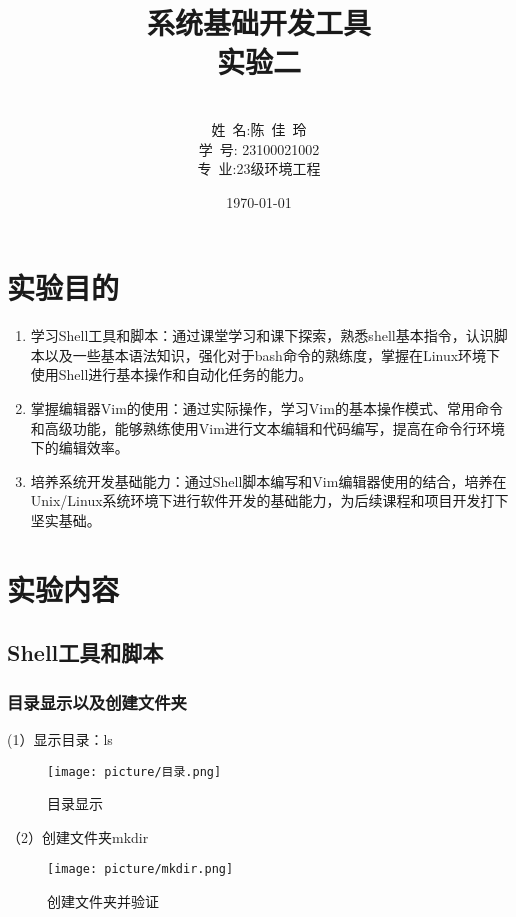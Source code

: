 \documentclass[UTF8]{ctexart}
\title{{\Huge 系统基础开发工具{\large\linebreak\\}}{\Large 实验二\linebreak\linebreak}}
\author{\\姓\ 名:陈\ 佳\ 玲\\
学\ 号: 23100021002\\
专\ 业:23级环境工程\\
}
\date{\today}
\begin{document}


\fancyfoot[C]{\thepage}

\maketitle
\tableofcontents
\newpage

\section{实验目的}
 \begin{enumerate}
    \item 学习Shell工具和脚本：通过课堂学习和课下探索，熟悉shell基本指令，认识脚本以及一些基本语法知识，强化对于bash命令的熟练度，掌握在Linux环境下使用Shell进行基本操作和自动化任务的能力。
    
    \item 掌握编辑器Vim的使用：通过实际操作，学习Vim的基本操作模式、常用命令和高级功能，能够熟练使用Vim进行文本编辑和代码编写，提高在命令行环境下的编辑效率。
    
    \item 培养系统开发基础能力：通过Shell脚本编写和Vim编辑器使用的结合，培养在Unix/Linux系统环境下进行软件开发的基础能力，为后续课程和项目开发打下坚实基础。
\end{enumerate}


\section{实验内容}

\subsection{Shell工具和脚本}

\subsubsection{目录显示以及创建文件夹}
(1）显示目录：ls
\begin{figure}[H]
    \centering
    \texttt{[image: picture/目录.png]}
    \caption{目录显示}
\end{figure}

（2）创建文件夹mkdir
\begin{figure}[H]
    \centering
    \texttt{[image: picture/mkdir.png]}
    \caption{创建文件夹并验证}
\end{figure}
\end{document}
